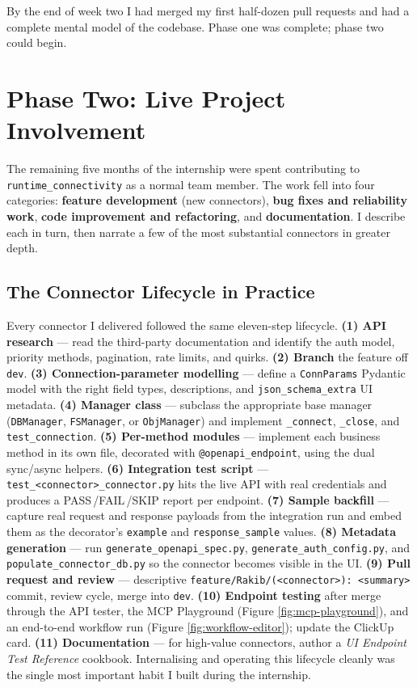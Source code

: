 By the end of week two I had merged my first half-dozen pull requests
and had a complete mental model of the codebase. Phase one was
complete; phase two could begin.

\section{Phase Two: Live Project Involvement}
The remaining five months of the internship were spent contributing
to \texttt{runtime\_connectivity} as a normal team member. The work
fell into four categories: \textbf{feature development} (new
connectors), \textbf{bug fixes and reliability work}, \textbf{code
improvement and refactoring}, and \textbf{documentation}. I describe
each in turn, then narrate a few of the most substantial connectors
in greater depth.

\subsection{The Connector Lifecycle in Practice}
Every connector I delivered followed the same eleven-step lifecycle.
\textbf{(1) API research} --- read the third-party documentation and
identify the auth model, priority methods, pagination, rate limits,
and quirks. \textbf{(2) Branch} the feature off \texttt{dev}.
\textbf{(3) Connection-parameter modelling} --- define a
\texttt{ConnParams} Pydantic model with the right field types,
descriptions, and \texttt{json\_schema\_extra} UI metadata.
\textbf{(4) Manager class} --- subclass the appropriate base manager
(\texttt{DBManager}, \texttt{FSManager}, or \texttt{ObjManager}) and
implement \texttt{\_connect}, \texttt{\_close}, and
\texttt{test\_connection}. \textbf{(5) Per-method modules} ---
implement each business method in its own file, decorated with
\texttt{@openapi\_endpoint}, using the dual sync/async helpers.
\textbf{(6) Integration test script} ---
\texttt{test\_<connector>\_connector.py} hits the live API with
real credentials and produces a
\textsc{PASS}\,/\textsc{FAIL}\,/\textsc{SKIP} report per endpoint.
\textbf{(7) Sample backfill} --- capture real request and response
payloads from the integration run and embed them as the decorator's
\texttt{example} and \texttt{response\_sample} values.
\textbf{(8) Metadata generation} --- run
\texttt{generate\_openapi\_spec.py},
\texttt{generate\_auth\_config.py}, and
\texttt{populate\_connector\_db.py} so the connector becomes
visible in the UI. \textbf{(9) Pull request and review} ---
descriptive \texttt{feature/Rakib/(<connector>): <summary>} commit,
review cycle, merge into \texttt{dev}.
\textbf{(10) Endpoint testing} after merge through the API tester,
the MCP Playground (Figure \ref{fig:mcp-playground}), and an
end-to-end workflow run (Figure \ref{fig:workflow-editor}); update
the ClickUp card. \textbf{(11) Documentation} --- for high-value
connectors, author a \emph{UI Endpoint Test Reference} cookbook.
Internalising and operating this lifecycle cleanly was the single
most important habit I built during the internship.

